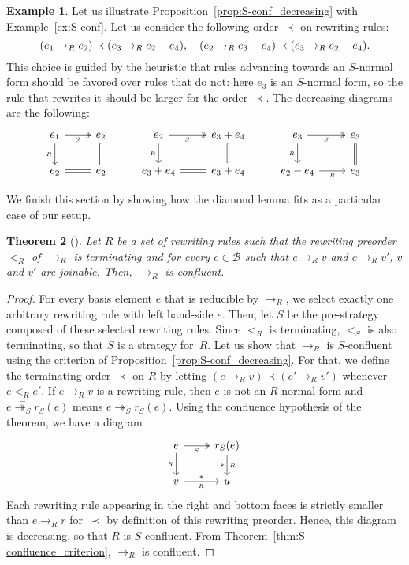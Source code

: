 \documentclass[10pt]{easychair}
\newtheorem{theorem}{Theorem}[section]
\theoremstyle{definition}
\newtheorem{example}[theorem]{Example}
\newcommand\basis{\mathscr{B}}
\newcommand\ordS{<_S}
\newcommand\rewR{\to_R}
\newcommand\parS{\twoheadrightarrow_S}
\begin{document}
\begin{example}\label{ex:end_to_example}
  Let us illustrate Proposition~\ref{prop:S-conf_decreasing} with
  Example~\ref{ex:S-conf}. Let us consider the following order $\prec$ on
  rewriting rules:
  \[(e_1\rewR e_2)\prec(e_3\rewR e_2-e_4),\quad(e_2\rewR e_3+e_4)\prec
  (e_3\rewR e_2-e_4).
  \smallskip\]
  This choice is guided by the heuristic that rules advancing towards an
  $S$-normal form should be favored over rules that do not: here $e_3$ is
  an $S$-normal form, so the rule that rewrites it should be larger for
  the order $\prec$. The decreasing diagrams are the following:
  \[\begin{tikzcd}
  e_1\ar[d, "_R"']\ar[r, twoheadrightarrow, "_S"'] &
  e_2\ar[d, equal] & e_2\ar[d, "_R"']
  \ar[r, twoheadrightarrow, "_S"'] & e_3+e_4\ar[d, equal] &
  e_3\ar[d, "_R"']\ar[r, twoheadrightarrow, "_S"'] & e_3\ar[d,equal]\\
  e_2\ar[r, equal] & e_2 & e_3+e_4\ar[r, equal] & e_3+e_4 & e_2-e_4
  \ar[r,  "_R"'] & e_3
  \end{tikzcd}\]
\end{example}
\smallskip

We finish this section by showing how the diamond lemma fits as a
particular case of our setup.
\medskip

\begin{theorem}[\cite{MR506890}]\label{thm:diamond_lemma}
  Let $R$ be a set of rewriting rules such that the rewriting preorder
  $<_R$ of~$\rewR$ is terminating and for every $e\in\basis$ such that
  $e\rewR v$ and $e\rewR v'$, $v$ and $v'$ are joinable. Then,~$\rewR$ is
  confluent.
\end{theorem}

\begin{proof}
  For every basis element $e$ that is reducible by $\rewR$, we select
  exactly one arbitrary rewriting rule with left hand-side
  $e$. Then, let $S$ be the pre-strategy composed of these selected
  rewriting rules. Since $<_R$ is terminating, $\ordS$ is also
  terminating, so that $S$ is a strategy for~$R$. Let us show that
  $\rewR$ is $S$-confluent using the criterion of
  Proposition~\ref{prop:S-conf_decreasing}. For that, we define the
  terminating order $\prec$ on $R$ by letting
  $(e\rewR v)\prec(e'\rewR v')$  whenever $e<_Re'$. If $e\rewR v$ is a
  rewriting rule, then $e$ is not an $R$-normal form and
  $e\overset{=}{\parS}r_S(e)$ means $e\parS r_S(e)$. Using the confluence
  hypothesis of the theorem, we have a diagram
  \[\begin{tikzcd}
  e\ar[d, "_R"']\ar[r, twoheadrightarrow, "_S"'] &
  r_S(e)\ar[d, rightarrow, "*"', "_R"]\\
  v\ar[r, rightarrow, "*", "_R"'] & u
  \end{tikzcd}\]
  Each rewriting rule appearing in the right and bottom faces is strictly
  smaller than $e\rewR r$ for~$\prec$ by definition of this rewriting
  preorder. Hence, this diagram is decreasing, so that $R$ is
  $S$-confluent. From Theorem~\ref{thm:S-confluence_criterion}, $\rewR$
  is confluent.   
\end{proof}
\smallskip
\end{document}
